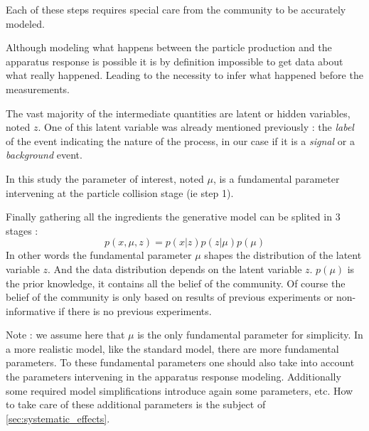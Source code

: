 Each of these steps requires special care from the community to be accurately modeled.

Although modeling what happens between the particle production and the apparatus response is possible it is by definition impossible to get data about what really happened.
Leading to the necessity to infer what happened before the measurements.


The vast majority of the intermediate quantities are latent or hidden variables, noted $z$.
One of this latent variable was already mentioned previously : the \emph{label} of the event indicating the nature of the process, in our case if it is a \emph{signal} or a \emph{background} event.


In this study the parameter of interest, noted $\mu$, is a fundamental parameter intervening at the particle collision stage (ie step 1).

Finally gathering all the ingredients the generative model can be splited in 3 stages :
\begin{equation}
	\label{eq:model_simple}
	p(x, \mu, z) = p(x|z) p(z | \mu) p(\mu)
\end{equation}
In other words the fundamental parameter $\mu$ shapes the distribution of the latent variable $z$.
And the data distribution depends on the latent variable $z$.
$p(\mu)$ is the prior knowledge, it contains all the belief of the community.
Of course the belief of the community is only based on results of previous experiments or non-informative if there is no previous experiments.

Note : we assume here that $\mu$ is the only fundamental parameter for simplicity.
In a more realistic model, like the standard model, there are more fundamental parameters.
To these fundamental parameters one should also take into account the parameters intervening in the apparatus response modeling.
Additionally some required model simplifications introduce again some parameters, etc.
How to take care of these additional parameters is the subject of \autoref{sec:systematic_effects}.

